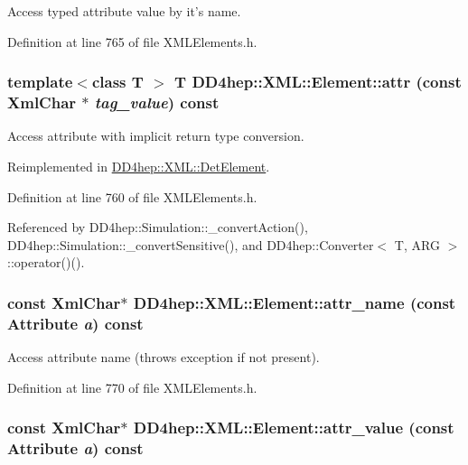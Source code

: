 Access typed attribute value by it's name. 

Definition at line 765 of file XMLElements.h.\hypertarget{class_d_d4hep_1_1_x_m_l_1_1_element_ab540a1af6399fe6a5b6ffe507dc3d4b5}{
\subsubsection[{attr}]{\setlength{\rightskip}{0pt plus 5cm}template$<$class T $>$ {\bf T} DD4hep::XML::Element::attr (const {\bf XmlChar} $\ast$ {\em tag\_\-value}) const}}
\label{class_d_d4hep_1_1_x_m_l_1_1_element_ab540a1af6399fe6a5b6ffe507dc3d4b5}


Access attribute with implicit return type conversion. 

Reimplemented in \hyperlink{struct_d_d4hep_1_1_x_m_l_1_1_det_element_a67cb642288a9c27ca09a1755ee92e994}{DD4hep::XML::DetElement}.

Definition at line 760 of file XMLElements.h.

Referenced by DD4hep::Simulation::\_\-convertAction(), DD4hep::Simulation::\_\-convertSensitive(), and DD4hep::Converter$<$ T, ARG $>$::operator()().\hypertarget{class_d_d4hep_1_1_x_m_l_1_1_element_a40e999c89474ff42500772098242643e}{
\subsubsection[{attr\_\-name}]{\setlength{\rightskip}{0pt plus 5cm}const {\bf XmlChar}$\ast$ DD4hep::XML::Element::attr\_\-name (const {\bf Attribute} {\em a}) const}}
\label{class_d_d4hep_1_1_x_m_l_1_1_element_a40e999c89474ff42500772098242643e}


Access attribute name (throws exception if not present). 

Definition at line 770 of file XMLElements.h.\hypertarget{class_d_d4hep_1_1_x_m_l_1_1_element_a685eb737e52bc28d9d7f3aff51f47bb5}{
\subsubsection[{attr\_\-value}]{\setlength{\rightskip}{0pt plus 5cm}const {\bf XmlChar}$\ast$ DD4hep::XML::Element::attr\_\-value (const {\bf Attribute} {\em a}) const}}
\label{class_d_d4hep_1_1_x_m_l_1_1_element_a685eb737e52bc28d9d7f3aff51f47bb5}


